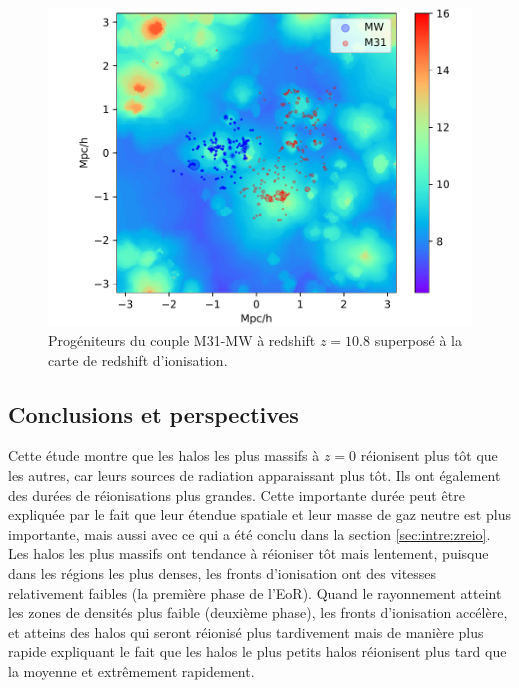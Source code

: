 \begin{figure}
		\centering
		\includegraphics[width=.95\linewidth]{img/05/map_LG.pdf}
        \caption[Réionisation du groupe local]{Progéniteurs du couple M31-MW à redshift $z=10.8$ superposé à la carte de redshift d'ionisation.
		\label{fig:CODA_LG}}
\end{figure}


\subsection{Conclusions et perspectives}


Cette étude montre que les halos les plus massifs à $z=0$ réionisent plus tôt que les autres, car leurs sources de radiation apparaissant plus tôt.
Ils ont également des durées de réionisations plus grandes.
Cette importante durée peut être expliquée par le fait que leur étendue spatiale et leur masse de gaz neutre est plus importante, mais aussi avec ce qui a été conclu dans la section \ref{sec:intre:zreio}.
Les halos les plus massifs ont tendance à réioniser tôt mais lentement, puisque dans les régions les plus denses, les fronts d'ionisation ont des vitesses relativement faibles (la première phase de l'\ac{EoR}).
Quand le rayonnement atteint les zones de densités plus faible (deuxième phase), les fronts d'ionisation accélère, et atteins des halos qui seront réionisé plus tardivement mais de manière plus rapide expliquant le fait que les halos le plus petits halos réionisent plus tard que la moyenne et extrêmement rapidement.

